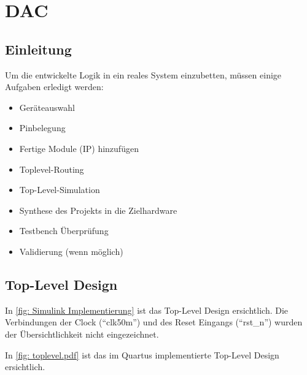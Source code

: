\documentclass[./\jobname.tex]{subfiles}
\begin{document}
%
\def\codeFolderName{DSM_DAC_toplevel_design_starting_point}
\def\codeFileName{}
\def\codeFolderNameB{}
%
\chapter{DAC}
%
\section{Einleitung}
%
Um die entwickelte Logik in ein reales System einzubetten, müssen einige Aufgaben erledigt werden:
%
\begin{itemize}
	\item Geräteauswahl
	\item Pinbelegung
	\item Fertige Module (IP) hinzufügen
	\item Toplevel-Routing
	\item Top-Level-Simulation
	\item Synthese des Projekts in die Zielhardware
	\item Testbench Überprüfung
	\item Validierung (wenn möglich)
\end{itemize}
%
\section{Top-Level Design}
%
In \autoref{fig: Simulink Implementierung} ist das Top-Level Design ersichtlich. Die Verbindungen der Clock (\enquote{clk50m}) und des Reset Eingangs (\enquote{rst\_n}) wurden der Übersichtlichkeit nicht eingezeichnet.
%
\begin{figure}[H]
	\centering
	\noindent{}
	\label{fig: Simulink Implementierung}
\end{figure}
%
In \autoref{fig: toplevel.pdf} ist das im Quartus implementierte Top-Level Design ersichtlich.
%
\begin{figure}[H]
	\centering
	\noindent{}
	\label{fig: toplevel.pdf}
\end{figure}
%
\end{document}
